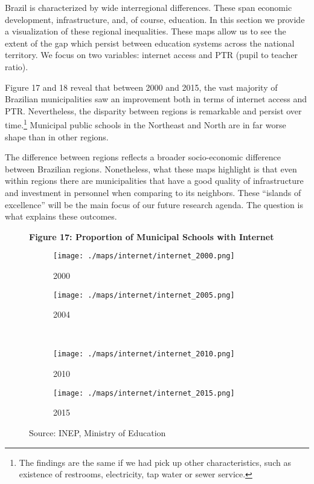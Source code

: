 \documentclass[12pt,]{book}
\let\rmarkdownfootnote\footnote%
\def\footnote{\protect\rmarkdownfootnote}
\begin{document}
Brazil is characterized by wide interregional differences. These span economic development, infrastructure, and, of course, education. In this section we provide a visualization of these regional inequalities. These maps allow us to see the extent of the gap which persist between education systems across the national territory. We focus on two variables: internet access and PTR (pupil to teacher ratio).

Figure 17 and 18 reveal that between 2000 and 2015, the vast majority of Brazilian municipalities saw an improvement both in terms of internet access and PTR. Nevertheless, the disparity between regions is remarkable and persist over time.\footnote{The findings are the same if we had pick up other characteristics, such as existence of restrooms, electricity, tap water or sewer service.} Municipal public schools in the Northeast and North are in far worse shape than in other regions.

The difference between regions reflects a broader socio-economic difference between Brazilian regions. Nonetheless, what these maps highlight is that even within regions there are municipalities that have a good quality of infrastructure and investment in personnel when comparing to its neighbors. These ``islands of excellence'' will be the main focus of our future research agenda. The question is what explains these outcomes.

\begin{figure}
    \centering
    \textbf{Figure 17: Proportion of Municipal Schools with Internet}
    \label{fig:map_internet}
     \begin{subfigure}{0.4\textwidth}
        \centering 
        \texttt{[image: ./maps/internet/internet\_2000.png]}
        \caption{2000}
    \end{subfigure} %
    \begin{subfigure}{0.4\textwidth}
        \centering
        \texttt{[image: ./maps/internet/internet\_2005.png]}
        \caption{2004}
    \end{subfigure} \\
    \begin{subfigure}{0.4\textwidth}
        \centering
        \texttt{[image: ./maps/internet/internet\_2010.png]}
        \caption{2010}
    \end{subfigure} %
    \begin{subfigure}{0.4\textwidth}
        \centering
        \texttt{[image: ./maps/internet/internet\_2015.png]}
        \caption{2015}
    \end{subfigure}
    \caption*{\footnotesize \hfill Source: INEP, Ministry of Education}
\end{figure}
\end{document}
